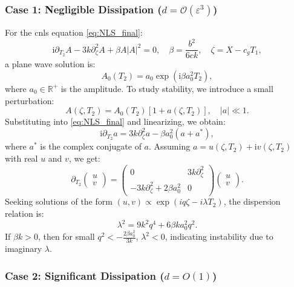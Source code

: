 \documentclass[alpha-refs, 12pt]{wiley-article}
\renewcommand{\O}{\mathcal{O}}
\newcommand{\ui}{\mathrm{i}}
\newcommand{\eps}{\varepsilon}
\begin{document}
\subsubsection*{Case 1: Negligible Dissipation ($d = \O(\eps^3)$)}

For the \acrfull{cnls} equation \eqref{eq:NLS_final}:
\[
  \ui \partial_{T_2} A - 3 k \partial_\zeta^2 A + \beta A |A|^2 = 0, \quad \beta = \frac{b^2}{6 c k}, \quad \zeta = X - c_g T_1,
\]
a plane wave solution is:
\begin{equation}\label{eq:plane_wave_case1}
  A_0(T_2) = a_0 \exp(\ui \beta a_0^2 T_2),
\end{equation}
where $a_0 \in \mathbb{R}^+$ is the amplitude. To study stability, we introduce a small perturbation:
\begin{equation}\label{eq:perturbation_case1}
  A(\zeta, T_2) = A_0(T_2) [1 + a(\zeta, T_2)], \quad |a| \ll 1.
\end{equation}
Substituting into \eqref{eq:NLS_final} and linearizing, we obtain:
\begin{equation}\label{eq:linearized_case1}
  \ui \partial_{T_2} a = 3 k \partial_{\zeta}^2 a - \beta a_0^2 (a + a^*),
\end{equation}
where $a^*$ is the complex conjugate of $a$. Assuming $a = u(\zeta, T_2) + \ui v(\zeta, T_2)$ with real $u$ and $v$, we get:
\begin{equation}\label{eq:matrix_case1}
  \partial_{T_2} \begin{pmatrix} u \\ v \end{pmatrix} = \begin{pmatrix}
0 & 3 k \partial_\zeta^2 \\
-3 k \partial_\zeta^2 + 2 \beta a_0^2 & 0
\end{pmatrix} \begin{pmatrix} u \\ v \end{pmatrix}.
\end{equation}
Seeking solutions of the form $(u, v) \propto \exp(i q \zeta - i \lambda T_2)$, the dispersion relation is:
\begin{equation}\label{eq:dispersion_case1}
  \lambda^2 = 9 k^2 q^4 + 6 \beta k a_0^2 q^2.
\end{equation}
If $\beta k > 0$, then for small $q^2 < -\frac{2 \beta a_0^2}{3 k}$, $\lambda^2 < 0$, indicating instability due to imaginary $\lambda$.

\subsubsection*{Case 2: Significant Dissipation ($d = O(1)$)}
\end{document}
